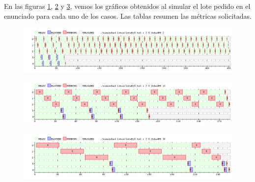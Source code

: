 En las figuras \ref{fig:ej5-1}, \ref{fig:ej5-2} y \ref{fig:ej5-3}, vemos los gráficos obtenidos al simular el lote pedido en el enunciado para cada uno de los casos. Las tablas resumen las métricas solicitadas.

\begin{figure}[H]
  \centering
  \includegraphics[width=1\textwidth]{img/imgEj5-1}
  \caption{}
  \label{fig:ej5-1}
\end{figure}

\begin{figure}[H]
  \centering
  \includegraphics[width=1\textwidth]{img/imgEj5-2}
  \caption{}
  \label{fig:ej5-2}
\end{figure}

\begin{figure}[H]
  \centering
  \includegraphics[width=1\textwidth]{img/imgEj5-3}
  \caption{}
  \label{fig:ej5-3}
\end{figure}

